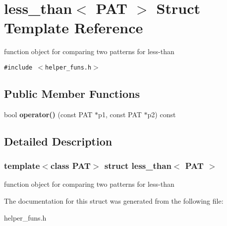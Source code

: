 \section{less\_\-than$<$ PAT $>$ Struct Template Reference}
\label{structless__than}
function object for comparing two patterns for less-than  


{\tt \#include $<$helper\_\-funs.h$>$}

\subsection*{Public Member Functions}
\begin{CompactItemize}
\item 
bool \textbf{operator()} (const PAT $\ast$p1, const PAT $\ast$p2) const \label{structless__than_09d4f9264d8dae93dc4d01f5422c0dd4}

\end{CompactItemize}


\subsection{Detailed Description}
\subsubsection*{template$<$class PAT$>$ struct less\_\-than$<$ PAT $>$}

function object for comparing two patterns for less-than 



The documentation for this struct was generated from the following file:\begin{CompactItemize}
\item 
helper\_\-funs.h\end{CompactItemize}
